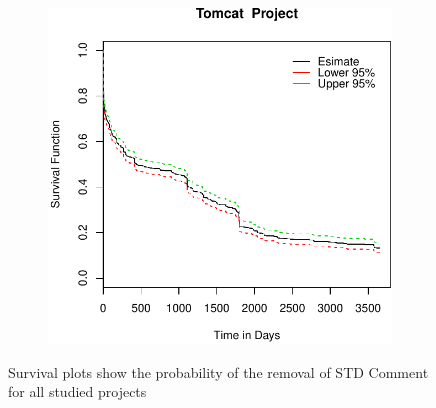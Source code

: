 \begin{figure}[t]
\begin{subfigure}[b]{0.195\textwidth}
	\end{subfigure}
	\begin{subfigure}[b]{0.195\textwidth}
		\includegraphics[width=\textwidth]{figures/Survival/tomcat.pdf}
	\end{subfigure}
		\caption{Survival plots show the probability of the removal of STD Comment for all studied projects}
		\label{fig:survival_plots}

\end{figure}

